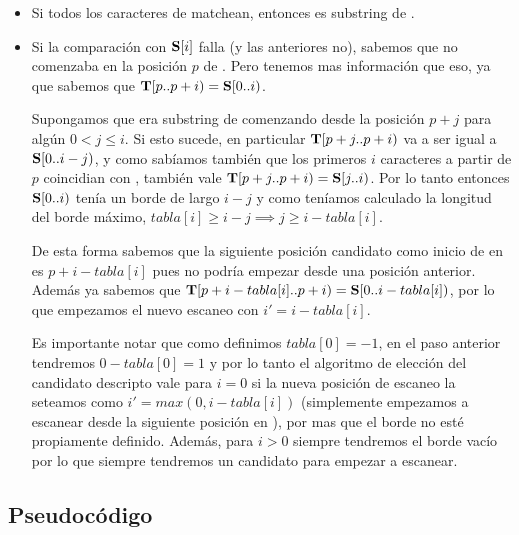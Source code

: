 \begin{itemize}
    \item Si todos los caracteres de \sS matchean, entonces \sS es substring de \sT.

    \item Si la comparación con $\textbf{S}[i]$ falla (y las anteriores no), sabemos que \sS no comenzaba en la posición $p$ de \sT. Pero tenemos mas información que eso, ya que sabemos que $\textbf{T}[p..p+i) = \textbf{S}[0..i)$.

        Supongamos que \sS era substring de \sT comenzando desde la posición $p+j$ para algún $0 < j \leq i$. Si esto sucede, en particular $\textbf{T}[p+j..p+i)$ va a ser igual a $\textbf{S}[0..i-j)$, y como sabíamos también que los primeros $i$ caracteres a partir de $p$ coincidian con \sS, también vale $\textbf{T}[p+j..p+i) = \textbf{S}[j..i)$. Por lo tanto entonces $\textbf{S}[0..i)$ tenía un borde de largo $i-j$ y como teníamos calculado la longitud del borde máximo, $tabla[i] \geq i-j \implies j \geq i - tabla[i]$.

        De esta forma sabemos que la siguiente posición candidato como inicio de \sS en \sT es $p + i - tabla[i]$ pues no podría empezar \sS desde una posición anterior.
        Además ya sabemos que $\textbf{T}[p + i - tabla[i].. p+i) = \textbf{S}[0..i - tabla[i])$, por lo que empezamos el nuevo escaneo con $i' = i - tabla[i]$.

        Es importante notar que como definimos $tabla[0] = -1$, en el paso anterior tendremos $0 - tabla[0] = 1$ y por lo tanto el algoritmo de elección del candidato descripto vale para $i=0$ si la nueva posición de escaneo la seteamos como $i' = max(0, i-tabla[i])$ (simplemente empezamos a escanear \sS desde la siguiente posición en \sT), por mas que el borde no esté propiamente definido.
        Además, para $i > 0$ siempre tendremos el borde vacío por lo que siempre tendremos un candidato para empezar a escanear.

\end{itemize}

\subsection{Pseudocódigo}

